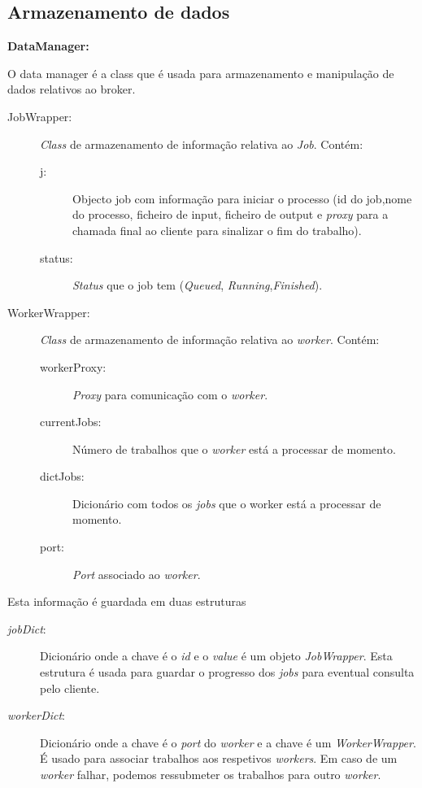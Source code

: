 \documentclass[a4paper]{article}
\begin{document}
\subsection{Armazenamento de dados}
\textbf{DataManager:}

O data manager é a class que é usada para armazenamento e manipulação de dados relativos ao broker.

\begin{description}
	\item[JobWrapper:]\hfill
	
	\emph{Class} de armazenamento de informação relativa ao \emph{Job}. Contém:
		\begin{description}
					\item[j:]
					Objecto job com informação para iniciar o processo (id do job,nome do processo, 		ficheiro de input, ficheiro de output e \emph{proxy} para a chamada final ao cliente para sinalizar o fim do trabalho).
					\item[status:]
					\emph{Status} que o job tem (\emph{Queued}, \emph{Running},\emph{Finished}).
			\end{description}
	
	\item[WorkerWrapper:]\hfill
	
	\emph{Class} de armazenamento de informação relativa ao \emph{worker}. Contém:
		\begin{description}
			\item[workerProxy:] \emph{Proxy} para comunicação com o \emph{worker}.
			\item[currentJobs:] Número de trabalhos que o \emph{worker} está a processar de momento.
			\item[dictJobs:] Dicionário com todos os \emph{jobs} que o worker está a processar de momento.
			\item[port:]\emph{Port} associado ao \emph{worker}.
		\end{description}
			
\end{description}

\medskip	
Esta informação é guardada em duas estruturas
		\begin{description}
		\item[\emph{jobDict}:] Dicionário onde a chave é o \emph{id} e o \emph{value} é um objeto \emph{JobWrapper}. Esta estrutura é usada para guardar o progresso dos \emph{jobs} para eventual consulta pelo cliente.
		\item[\emph{workerDict}:] Dicionário onde a chave é o \emph{port} do \emph{worker} e a chave é um \emph{WorkerWrapper}. É usado para associar trabalhos aos respetivos \emph{workers}. Em caso de um \emph{worker} falhar, podemos ressubmeter os trabalhos para outro \emph{worker}.

	\end{description}
\end{document}
